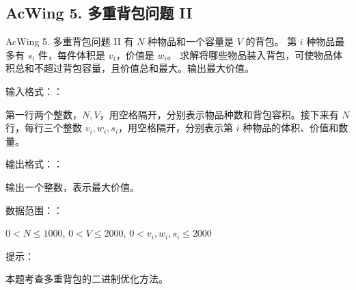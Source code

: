 \subsection{AcWing 5. 多重背包问题 II}
\begin{titledbox}{AcWing 5. 多重背包问题 II}
    有 $N$ 种物品和一个容量是 $V$ 的背包。 第 $i$ 种物品最多有 $s_i$ 件，每件体积是 $v_i$，价值是 $w_i$。 求解将哪些物品装入背包，可使物品体积总和不超过背包容量，且价值总和最大。输出最大价值。

    输入格式：：

    第一行两个整数，$N, V$，用空格隔开，分别表示物品种数和背包容积。接下来有 $N$ 行，每行三个整数 $v_i, w_i, s_i$，用空格隔开，分别表示第 $i$ 种物品的体积、价值和数量。

    输出格式：：

    输出一个整数，表示最大价值。

    数据范围：：

    $0  < N \le 1000$, $0  < V \le 2000$, $0  < v_i, w_i, s_i \le 2000$

    提示：

    本题考查多重背包的二进制优化方法。

    \begin{inputblock}
         \\
         \\
         \\
         \\
    \end{inputblock}
    \begin{outputblock}
    \end{outputblock}
\end{titledbox}

